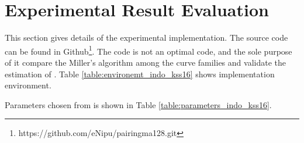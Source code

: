 \section{Experimental Result Evaluation}
This section gives details of the experimental implementation. The source code can be found in Github\footnote{\label{source_code_indo}https://github.com/eNipu/pairingma128.git}. 
The code  is not an optimal code, and the sole purpose of it compare the Miller's algorithm among the curve families and validate the estimation of \cite{EPRINT:BarDuq17}.
Table \ref{table:environemt_indo_kss16} shows implementation environment.  
\renewcommand{\baselinestretch}{1.5}
\begin{table}[ht]
\centering
\caption{Computational environment.}
\label{table:environemt_indo_kss16}
\end{table}
\renewcommand{\baselinestretch}{1.0}
Parameters chosen from \cite{EPRINT:BarDuq17} is shown in Table \ref{table:parameters_indo_kss16}.
\renewcommand{\baselinestretch}{1.5}
\begin{table}[ht]
\caption{Selected parameters for 128-bit security level \cite{EPRINT:BarDuq17}.}
\label{table:parameters_indo_kss16}
\begin{center}		 
\end{center}
\end{table}
